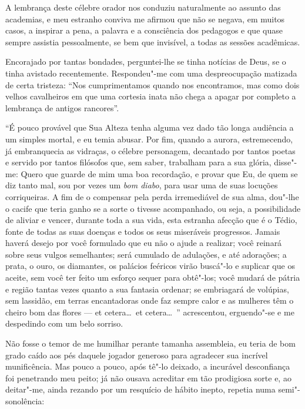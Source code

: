 A lembrança deste célebre orador nos conduziu naturalmente ao assunto
das academias, e meu estranho conviva me afirmou que não se negava, em
muitos casos, a inspirar a pena, a palavra e a consciência dos
pedagogos e que quase sempre assistia pessoalmente, se bem que invisível,
a todas as sessões acadêmicas.

Encorajado por tantas bondades, perguntei-lhe se tinha notícias de
Deus, se o tinha avistado recentemente. Respondeu"-me com uma
despreocupação matizada de certa tristeza: “Nos
cumprimentamos quando nos encontramos, mas como dois velhos
cavalheiros em que uma cortesia inata não chega a apagar
por completo a lembrança de antigos rancores''.

“É pouco provável que Sua Alteza tenha alguma vez dado tão longa
audiência a um simples mortal, e eu temia abusar. Por fim, quando a
aurora, estremecendo, já embranquecia as vidraças, o célebre
personagem, decantado por tantos poetas e servido por tantos filósofos
que, sem saber, trabalham para a sua glória, disse"-me: Quero
que guarde de mim uma boa recordação, e provar que Eu, de
quem se diz tanto mal, sou por vezes um \textit{bom diabo}, para usar uma de
suas locuções corriqueiras. A fim de o compensar pela perda
irremediável de sua alma, dou"-lhe o cacife que teria ganho se a
sorte o tivesse acompanhado, ou seja, a possibilidade de aliviar e 
vencer, durante toda a sua vida, esta estranha afecção que é o Tédio,
fonte de todas as suas doenças e todos os seus miseráveis progressos.
Jamais haverá desejo por você formulado que eu não o ajude a realizar;
você reinará sobre seus vulgos semelhantes; será cumulado de
adulações, e até adorações; a prata, o ouro, os diamantes, os
palácios feéricos virão buscá"-lo e suplicar que os aceite, sem
você ter feito um esforço sequer para obtê"-los; você mudará de
pátria e região tantas vezes quanto a sua fantasia ordenar; se
embriagará de volúpias, sem lassidão, em terras encantadoras onde faz
sempre calor e as mulheres têm o cheiro bom das flores
--- et cetera\ldots\  et cetera\ldots\ '' acrescentou, erguendo"-se e
me despedindo com um belo sorriso.

Não fosse o temor de me humilhar perante tamanha assembleia, eu teria
de bom grado caído aos pés daquele jogador generoso para agradecer
sua incrível munificência. Mas pouco a pouco, após tê"-lo deixado, a
incurável desconfiança foi penetrando meu peito; já não ousava acreditar em
tão prodigiosa sorte e, ao deitar"-me, ainda rezando por um
resquício de hábito inepto, repetia numa semi"-sonolência:

